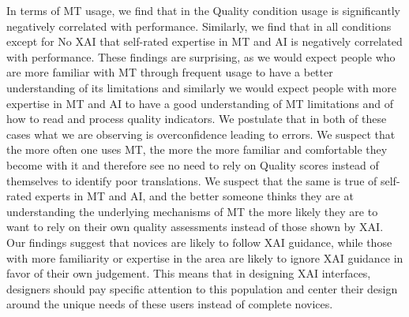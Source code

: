 In terms of MT usage, we find that in the Quality condition usage is significantly negatively correlated with performance. Similarly, we find that in all conditions except for No XAI that self-rated expertise in MT and AI is negatively correlated with performance. These findings are surprising, as we would expect people who are more familiar with MT through frequent usage to have a better understanding of its limitations and similarly we would expect people with more expertise in MT and AI to have a good understanding of MT limitations and of how to read and process quality indicators. We postulate that in both of these cases what we are observing is overconfidence leading to errors. We suspect that the more often one uses MT, the more the more familiar and comfortable they become with it and therefore see no need to rely on Quality scores instead of themselves to identify poor translations. We suspect that the same is true of self-rated experts in MT and AI, and the better someone thinks they are at understanding the underlying mechanisms of MT the more likely they are to want to rely on their own quality assessments instead of those shown by XAI.  Our findings suggest that novices are likely to follow XAI guidance, while those with more familiarity or expertise in the area are likely to ignore XAI guidance in favor of their own judgement. This means that in designing XAI interfaces, designers should pay specific attention to this population and center their design around the unique needs of these users instead of complete novices.  


 



